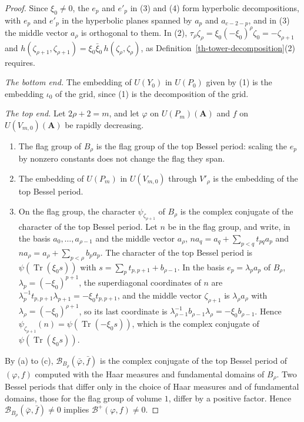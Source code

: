 \begin{proof}
Since $\xi_0\neq0$, the $e_p$ and $e'_p$ in (3) and (4) form hyperbolic
decompositions, with $e_p$ and $e'_p$ in the hyperbolic planes spanned by
$a_p$ and $a_{c-2-p}$, and in (3) the middle vector $a_\rho$ is orthogonal to
them. In (2),
$\tau_\rho\zeta_\rho=\xi_0(-\xi_0)^\rho\zeta_0=-\zeta_{\rho+1}$ and
$h(\zeta_{\rho+1},\zeta_{\rho+1})=\xi_0\bar\xi_0\,h(\zeta_\rho,\zeta_\rho)$, as
Definition~\ref{th-tower-decomposition}(2) requires.

\emph{The bottom end.} The embedding of $U(Y_0)$ in $U(P_0)$ given by (1) is
the embedding $\iota_0$ of the grid, since (1) is the decomposition of the
grid.

\emph{The top end.} Let $2\rho+2=m$, and let $\varphi$ on $U(P_m)(\mathbf A)$
and $f$ on $U(V_{m,0})(\mathbf A)$ be rapidly decreasing.
\begin{enumerate}
\item[(a)] The flag group of $B_\rho$ is the flag group of the top Bessel
  period: scaling the $e_p$ by nonzero constants does not change the flag
  they span.
\item[(b)] The embedding of $U(P_m)$ in $U(V_{m,0})$ through $V'_\rho$ is the
  embedding of the top Bessel period.
\item[(c)] On the flag group, the character $\psi_{\zeta_{\rho+1}}$ of $B_\rho$
  is the complex conjugate of the character of the top Bessel period. Let $n$
  be in the flag group, and write, in the basis $a_0,\ldots,a_{\rho-1}$ and the
  middle vector $a_\rho$,
  $na_q=a_q+\sum_{p<q}t_{pq}a_p$ and $na_\rho=a_\rho+\sum_{p<\rho}b_pa_p$. The character of the top Bessel period is
  $\psi(\operatorname{Tr}(\xi_0s))$ with $s=\sum_pt_{p,p+1}+b_{\rho-1}$. In the
  basis $e_p=\lambda_pa_p$ of $B_\rho$, $\lambda_p=(-\xi_0)^{p+1}$, the
  superdiagonal coordinates of $n$ are
  $\lambda_p^{-1}t_{p,p+1}\lambda_{p+1}=-\xi_0t_{p,p+1}$, and the middle vector
  $\zeta_{\rho+1}$ is $\lambda_\rho a_\rho$ with $\lambda_\rho=(-\xi_0)^{\rho+1}$,
  so its last coordinate is $\lambda_{\rho-1}^{-1}b_{\rho-1}\lambda_\rho=-\xi_0b_{\rho-1}$.
  Hence $\psi_{\zeta_{\rho+1}}(n)=\psi(\operatorname{Tr}(-\xi_0s))$, which is
  the complex conjugate of $\psi(\operatorname{Tr}(\xi_0s))$.
\end{enumerate}
By (a) to (c),
$\mathcal B_{B_\rho}(\bar\varphi,\bar f)$ is the complex conjugate of the top
Bessel period of $(\varphi,f)$ computed with the Haar measures and fundamental
domains of $B_\rho$. Two Bessel periods that differ only in the choice of Haar
measures and of fundamental domains, those for the flag group of volume $1$,
differ by a positive factor. Hence $\mathcal B_{B_\rho}(\bar\varphi,\bar f)\neq0$
implies $\mathcal B^+(\varphi,f)\neq0$.


\end{proof}
